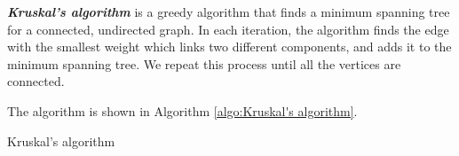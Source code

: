 \documentclass[12pt,a4paper]{ctexart}
\newcommand{\highlight}[1]{\textbf{\textit{#1}}}
\begin{document}
    \highlight{Kruskal's algorithm} is a greedy algorithm that finds a minimum spanning tree for a connected, undirected graph. In each iteration, the algorithm finds the edge with the smallest weight which links two different components, and adds it to the minimum spanning tree. We repeat this process until all the vertices are connected.

    The algorithm is shown in Algorithm \ref{algo:Kruskal's algorithm}.

    \begin{algorithm}[!htbp]
        \caption{Kruskal's algorithm}
        \label{algo:Kruskal's algorithm}


    \end{algorithm}
\end{document}
